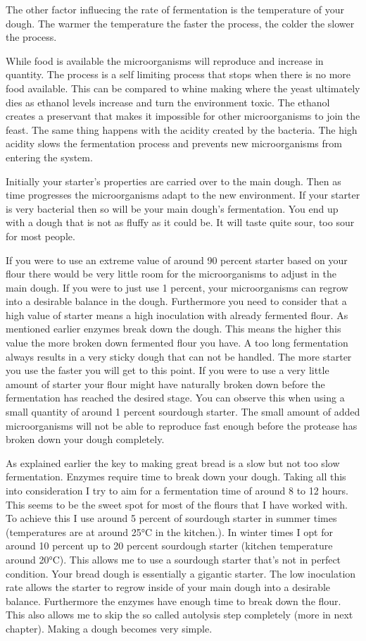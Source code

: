 The other factor influecing the rate of fermentation is the temperature of
your dough. The warmer the temperature the faster the process, the colder the
slower the process.

While food is available the microorganisms will reproduce and increase in
quantity. The process is a self limiting process that stops when there is no
more food available. This can be compared to whine making where
the yeast ultimately dies as ethanol levels increase and turn the environment
toxic. The ethanol creates a preservant that makes it impossible for other
microorganisms to join the feast. The same thing happens with the acidity
created by the bacteria. The high acidity slows the fermentation process and
prevents new microorganisms from entering the system.

Initially your starter's properties are carried over to the main dough. Then
as time progresses the microorganisms adapt to the new environment. If your
starter is very bacterial then so will be your main dough's fermentation. You
end up with a dough that is not as fluffy as it could be. It will taste quite
sour, too sour for most people.

If you were to use an extreme value of around 90 percent starter based on your flour there
would be very little room for the microorganisms to adjust in the main dough.
If you were to just use 1 percent, your microorganisms can regrow into a
desirable balance in the dough. Furthermore you need to consider that a high value
of starter means a high inoculation with already fermented flour. As
mentioned earlier enzymes break down the dough. This means the higher this
value the more broken down fermented flour you have. A too long fermentation
always results in a very sticky dough that can not be handled. The more
starter you use the faster you will get to this point. If you were to use a
very little amount of starter your flour might have naturally broken down
before the fermentation has reached the desired stage. You can observe this
when using a small quantity of around 1 percent sourdough starter. The small
amount of added microorganisms will not be able to reproduce fast enough
before the protease has broken down your dough completely.

As explained earlier the key to making great bread is a slow but not too slow
fermentation. Enzymes require time to break down your dough. Taking all this
into consideration I try to aim for a fermentation time of around 8 to 12 hours. This seems to be
the sweet spot for most of the flours that I have worked with. To achieve this
I use around 5 percent of sourdough starter in summer times (temperatures are
at around 25°C in the kitchen.). In winter times I opt for around 10 percent
up to 20 percent sourdough starter (kitchen temperature around 20°C). This
allows me to use a sourdough starter that's not in perfect condition. Your
bread dough is essentially a gigantic starter. The low inoculation rate allows
the starter to regrow inside of your main dough into a desirable balance.
Furthermore the enzymes have enough time to break down the flour. This also
allows me to skip the so called autolysis step completely (more in next chapter).
 Making a dough becomes very simple.

